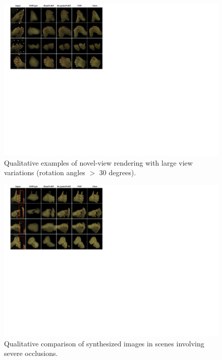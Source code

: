 \documentclass[letterpaper]{article}
\begin{document}
\begin{figure}[t]
  \centering
  \includegraphics[width=1.0\hsize]{figures/large_view.pdf}
  \caption{Qualitative examples of novel-view rendering with large view variations (rotation angles $>$ 30 degrees).}
  \label{fig:large_view}
\end{figure}

\begin{figure}[t]
  \centering
  \includegraphics[width=1.0\hsize]{figures/occlusion.pdf}
  \caption{Qualitative comparison of synthesized images in scenes involving severe occlusions.}
  \label{fig:occlusion}
\end{figure}
\end{document}
